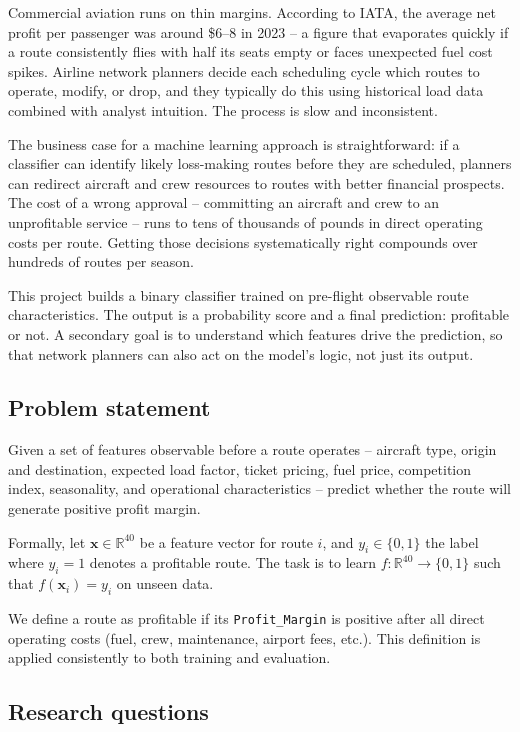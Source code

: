 \documentclass[12pt,a4paper]{article}
\begin{document}
Commercial aviation runs on thin margins. According to IATA, the average net profit per passenger was around \$6--8 in 2023 -- a figure that evaporates quickly if a route consistently flies with half its seats empty or faces unexpected fuel cost spikes. Airline network planners decide each scheduling cycle which routes to operate, modify, or drop, and they typically do this using historical load data combined with analyst intuition. The process is slow and inconsistent.

The business case for a machine learning approach is straightforward: if a classifier can identify likely loss-making routes before they are scheduled, planners can redirect aircraft and crew resources to routes with better financial prospects. The cost of a wrong approval -- committing an aircraft and crew to an unprofitable service -- runs to tens of thousands of pounds in direct operating costs per route. Getting those decisions systematically right compounds over hundreds of routes per season.

This project builds a binary classifier trained on pre-flight observable route characteristics. The output is a probability score and a final prediction: profitable or not. A secondary goal is to understand which features drive the prediction, so that network planners can also act on the model's logic, not just its output.

\subsection{Problem statement}
\label{subsec:problem}

Given a set of features observable before a route operates -- aircraft type, origin and destination, expected load factor, ticket pricing, fuel price, competition index, seasonality, and operational characteristics -- predict whether the route will generate positive profit margin.

Formally, let $\mathbf{x} \in \mathbb{R}^{40}$ be a feature vector for route $i$, and $y_i \in \{0, 1\}$ the label where $y_i = 1$ denotes a profitable route. The task is to learn $f: \mathbb{R}^{40} \to \{0, 1\}$ such that $f(\mathbf{x}_i) = y_i$ on unseen data.

We define a route as profitable if its \texttt{Profit\_Margin} is positive after all direct operating costs (fuel, crew, maintenance, airport fees, etc.). This definition is applied consistently to both training and evaluation.

\subsection{Research questions}
\label{subsec:rq}
\end{document}
